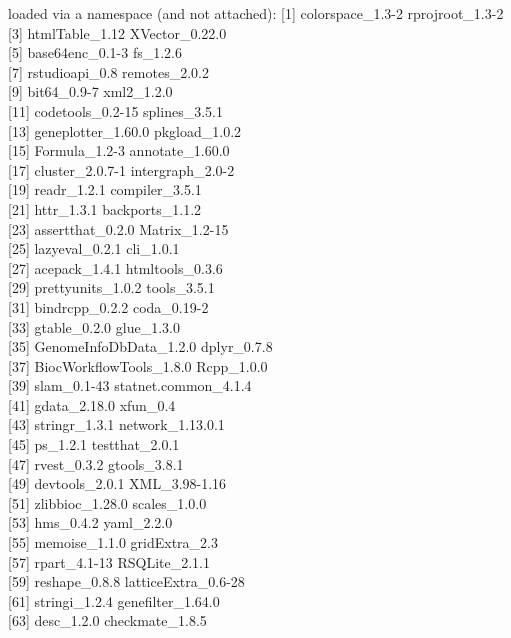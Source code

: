 \documentclass[9pt,a4paper,]{extarticle}
\theoremstyle{definition}
\theoremstyle{definition}
\theoremstyle{definition}
\theoremstyle{remark}
\begin{document}
loaded via a namespace (and not attached):
{[}1{]} colorspace\_1.3-2 rprojroot\_1.3-2\\
{[}3{]} htmlTable\_1.12 XVector\_0.22.0\\
{[}5{]} base64enc\_0.1-3 fs\_1.2.6\\
{[}7{]} rstudioapi\_0.8 remotes\_2.0.2\\
{[}9{]} bit64\_0.9-7 xml2\_1.2.0\\
{[}11{]} codetools\_0.2-15 splines\_3.5.1\\
{[}13{]} geneplotter\_1.60.0 pkgload\_1.0.2\\
{[}15{]} Formula\_1.2-3 annotate\_1.60.0\\
{[}17{]} cluster\_2.0.7-1 intergraph\_2.0-2\\
{[}19{]} readr\_1.2.1 compiler\_3.5.1\\
{[}21{]} httr\_1.3.1 backports\_1.1.2\\
{[}23{]} assertthat\_0.2.0 Matrix\_1.2-15\\
{[}25{]} lazyeval\_0.2.1 cli\_1.0.1\\
{[}27{]} acepack\_1.4.1 htmltools\_0.3.6\\
{[}29{]} prettyunits\_1.0.2 tools\_3.5.1\\
{[}31{]} bindrcpp\_0.2.2 coda\_0.19-2\\
{[}33{]} gtable\_0.2.0 glue\_1.3.0\\
{[}35{]} GenomeInfoDbData\_1.2.0 dplyr\_0.7.8\\
{[}37{]} BiocWorkflowTools\_1.8.0 Rcpp\_1.0.0\\
{[}39{]} slam\_0.1-43 statnet.common\_4.1.4\\
{[}41{]} gdata\_2.18.0 xfun\_0.4\\
{[}43{]} stringr\_1.3.1 network\_1.13.0.1\\
{[}45{]} ps\_1.2.1 testthat\_2.0.1\\
{[}47{]} rvest\_0.3.2 gtools\_3.8.1\\
{[}49{]} devtools\_2.0.1 XML\_3.98-1.16\\
{[}51{]} zlibbioc\_1.28.0 scales\_1.0.0\\
{[}53{]} hms\_0.4.2 yaml\_2.2.0\\
{[}55{]} memoise\_1.1.0 gridExtra\_2.3\\
{[}57{]} rpart\_4.1-13 RSQLite\_2.1.1\\
{[}59{]} reshape\_0.8.8 latticeExtra\_0.6-28\\
{[}61{]} stringi\_1.2.4 genefilter\_1.64.0\\
{[}63{]} desc\_1.2.0 checkmate\_1.8.5\\
\end{document}
